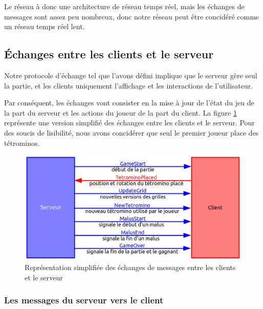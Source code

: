 \documentclass[a4paper, 12pt]{article}
\begin{document}
			Le réseau à donc une architecture de réseau temps réel, mais les échanges de messages sont assez peu nombreux, donc notre réseau peut être concidéré comme un réseau temps réel lent.

		\subsection{\'Echanges entre les clients et le serveur}

			Notre protocole d'échange tel que l'avons défini implique que le serveur gère seul la partie, et les clients uniquement l'affichage et les interactions de l'utilisateur.

			Par conséquent, les échanges vont consister en la mise à jour de l'état du jeu de la part du serveur et les actions du joueur de la part du client. 
			La figure \ref{fig:echange} représente une version simplifié des échanges entre les clients et le serveur. Pour des soucis de lisibilité, nous avons concidérer que seul le premier joueur place des tétrominos.

			\begin{figure}[bt]
				\centering
				\includegraphics[scale=0.45]{img/ech.png}
				\caption{Représentation simplifiée des échanges de messages entre les clients et le serveur}
				\label{fig:echange}
			\end{figure}


			\subsubsection{Les messages du serveur vers le client}
\end{document}
